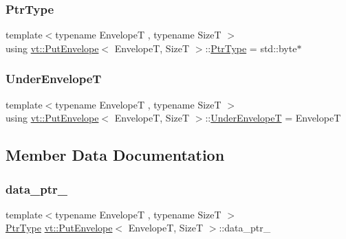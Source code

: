 \mbox{\label{structvt_1_1_put_envelope_a19b17e2c7298ec892cd5a948d0a2d7f4}} 
\subsubsection{\texorpdfstring{Ptr\+Type}{PtrType}}
{\footnotesize\ttfamily template$<$typename EnvelopeT , typename SizeT $>$ \\
using \hyperlink{structvt_1_1_put_envelope}{vt\+::\+Put\+Envelope}$<$ EnvelopeT, SizeT $>$\+::\hyperlink{structvt_1_1_put_envelope_a19b17e2c7298ec892cd5a948d0a2d7f4}{Ptr\+Type} =  std\+::byte$\ast$}

\mbox{\label{structvt_1_1_put_envelope_a8e9e6c105983442674c194da5712df28}} 
\subsubsection{\texorpdfstring{Under\+EnvelopeT}{UnderEnvelopeT}}
{\footnotesize\ttfamily template$<$typename EnvelopeT , typename SizeT $>$ \\
using \hyperlink{structvt_1_1_put_envelope}{vt\+::\+Put\+Envelope}$<$ EnvelopeT, SizeT $>$\+::\hyperlink{structvt_1_1_put_envelope_a8e9e6c105983442674c194da5712df28}{Under\+EnvelopeT} =  EnvelopeT}



\subsection{Member Data Documentation}
\mbox{\label{structvt_1_1_put_envelope_a6cba549a8e4a1fd5ff577979bad80300}} 
\subsubsection{\texorpdfstring{data\+\_\+ptr\+\_\+}{data\_ptr\_}}
{\footnotesize\ttfamily template$<$typename EnvelopeT , typename SizeT $>$ \\
\hyperlink{structvt_1_1_put_envelope_a19b17e2c7298ec892cd5a948d0a2d7f4}{Ptr\+Type} \hyperlink{structvt_1_1_put_envelope}{vt\+::\+Put\+Envelope}$<$ EnvelopeT, SizeT $>$\+::data\+\_\+ptr\+\_\+}

